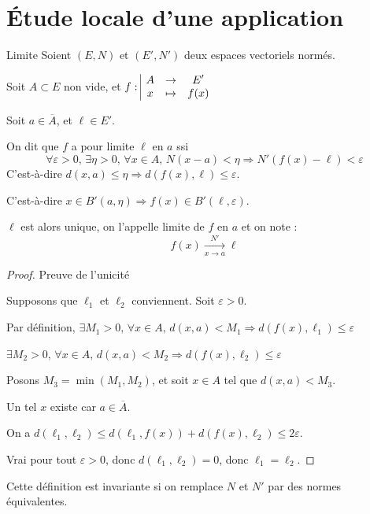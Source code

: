 \section{Étude locale d'une application}

\begin{definition}{Limite}{}
    Soient $(E, N)$ et $(E', N')$ deux espaces vectoriels normés. 

    Soit $A \subset E$ non vide, et $f: \space \begin{array}{|ccc} \displaystyle A & \to & \displaystyle E' \\ \displaystyle x & \mapsto & \displaystyle f(x) \end{array}$

    Soit $a \in \overline A$, et $\ell \in E'$.

    On dit que $f$ a pour limite $\ell$ en $a$ ssi 
    \[\forall \varepsilon > 0, \, \exists \eta > 0, \, \forall x \in A, \, N(x - a) < \eta \Rightarrow N'(f(x) - \ell) < \varepsilon\]
    C'est-à-dire $d(x, a) \leqslant \eta \Rightarrow d(f(x), \ell) \leqslant \varepsilon$.

    C'est-à-dire $x \in B'(a, \eta) \Rightarrow f(x) \in B'(\ell, \varepsilon)$.

    $\ell$ est alors unique, on l'appelle limite de $f$ en $a$ et on note :
    \[f(x) \xrightarrow[x \to a ]{N'} \ell\]
\end{definition}

\begin{proof}
    Preuve de l'unicité 

    Supposons que $\ell_1$ et $\ell_2$ conviennent. Soit $\varepsilon > 0$.

    Par définition, $\exists M_1 > 0, \, \forall x \in A, \, d(x, a) < M_1  \Rightarrow d(f(x), \ell_1) \leqslant \varepsilon$

    $\exists M_2 > 0, \, \forall x \in A, \, d(x, a) < M_2  \Rightarrow d(f(x), \ell_2) \leqslant \varepsilon$

    Posons $M_3 = \min(M_1, M_2)$, et soit $x \in A$ tel que $d(x, a) < M_3$.

    Un tel $x$ existe car $a \in \overline A$.

    On a $d(\ell_1, \ell_2) \leqslant d(\ell_1, f(x)) + d(f(x), \ell_2) \leqslant 2 \varepsilon$.

    Vrai pour tout $\varepsilon > 0$, donc $d(\ell_1, \ell_2) = 0$, donc $\ell_1 = \ell_2$.
\end{proof}

\begin{remarque}
    Cette définition est invariante si on remplace $N$ et $N'$ par des normes équivalentes.
\end{remarque}

